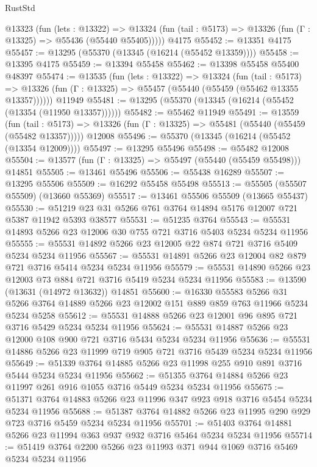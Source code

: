 \begin{lexlean}{RustStd}
\begin{coremodule}
    @13323
      (fun (lets : @13322) =>
      @13324 (fun (tail : @5173) => @13326 (fun (Γ : @13325) => @55436 (@55440 @55405)))))
    @4175
@55452 := @13351 @4175
@55457 := @13295 (@55370 (@13345 (@16214 (@55452 @13359))))
@55458 := @13395 @4175
@55459 := @13394 @55458
@55462 := @13398 @55458 @55400 @48397
@55474 := @13535
    (fun (lets : @13322) =>
    @13324
      (fun (tail : @5173) =>
      @13326 (fun (Γ : @13325) => @55457 (@55440 (@55459 (@55462 @13355 @13357))))))
    @11949
@55481 := @13295 (@55370 (@13345 (@16214 (@55452 (@13354 (@11950 @13357))))))
@55482 := @55462 @11949
@55491 := @13559
    (fun (tail : @5173) => @13326 (fun (Γ : @13325) => @55481 (@55440 (@55459 (@55482 @13357)))))
    @12008
@55496 := @55370 (@13345 (@16214 (@55452 (@13354 @12009))))
@55497 := @13295 @55496
@55498 := @55482 @12008
@55504 := @13577 (fun (Γ : @13325) => @55497 (@55440 (@55459 @55498))) @14851
@55505 := @13461 @55496
@55506 := @55438 @16289
@55507 := @13295 @55506
@55509 := @16292 @55458 @55498
@55513 := @55505 (@55507 @55509) (@13660 @55369)
@55517 := @13461 @55506 @55509 (@13665 @55437)
@55530 := @51219 @23 @31 @5266 @761 @3764 @14894 @5176 @12007 @721 @5387 @11942 @5393 @38577
@55531 := @51235 @3764
@55543 := @55531 @14893 @5266 @23 @12006 @30 @755 @721 @3716 @5403 @5234 @5234 @11956
@55555 := @55531 @14892 @5266 @23 @12005 @22 @874 @721 @3716 @5409 @5234 @5234 @11956
@55567 := @55531 @14891 @5266 @23 @12004 @82 @879 @721 @3716 @5414 @5234 @5234 @11956
@55579 := @55531 @14890 @5266 @23 @12003 @73 @884 @721 @3716 @5419 @5234 @5234 @11956
@55583 := @13590 (@13631 (@14972 @13632)) @14851
@55600 := @16330
    @55583
    @5266
    @31
    @5266
    @3764
    @14889
    @5266
    @23
    @12002
    @151
    @889
    @859
    @763
    @11966
    @5234
    @5234
    @5258
@55612 := @55531 @14888 @5266 @23 @12001 @96 @895 @721 @3716 @5429 @5234 @5234 @11956
@55624 := @55531 @14887 @5266 @23 @12000 @108 @900 @721 @3716 @5434 @5234 @5234 @11956
@55636 := @55531 @14886 @5266 @23 @11999 @719 @905 @721 @3716 @5439 @5234 @5234 @11956
@55649 := @51339 @3764 @14885 @5266 @23 @11998 @255 @910 @891 @3716 @5444 @5234 @5234 @11956
@55662 := @51355 @3764 @14884 @5266 @23 @11997 @261 @916 @1055 @3716 @5449 @5234 @5234 @11956
@55675 := @51371 @3764 @14883 @5266 @23 @11996 @347 @923 @918 @3716 @5454 @5234 @5234 @11956
@55688 := @51387 @3764 @14882 @5266 @23 @11995 @290 @929 @723 @3716 @5459 @5234 @5234 @11956
@55701 := @51403 @3764 @14881 @5266 @23 @11994 @363 @937 @932 @3716 @5464 @5234 @5234 @11956
@55714 := @51419 @3764 @2200 @5266 @23 @11993 @371 @944 @1069 @3716 @5469 @5234 @5234 @11956

\end{coremodule}
\end{lexlean}
